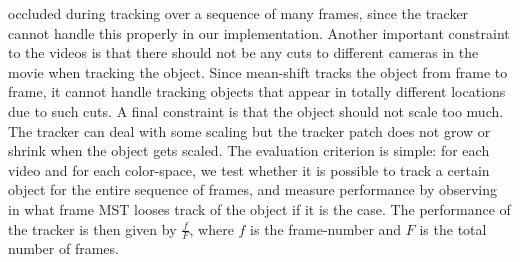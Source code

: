 \documentclass[a4paper,11pt]{article}
\begin{document}
		occluded during tracking over a sequence of many frames, since the tracker cannot handle this properly in our implementation.	Another important constraint to the videos is that there should not be any cuts to different cameras in the movie when tracking the object. Since mean-shift tracks the object from frame to frame, it cannot handle tracking objects that appear in totally different locations due		to such cuts. A final constraint is that the object should not scale too much. The tracker can deal with some scaling but the tracker patch does not grow or shrink when the object gets scaled. The evaluation criterion is simple: for each video and for each color-space, we test whether it is possible to track a certain object for the entire sequence of frames, and measure performance by observing in what frame MST looses track of the object if it is the case. The performance of the tracker is then given by $\frac{f}{F}$, where $f$ is the frame-number and $F$ is the total number of frames.
		
\end{document}
